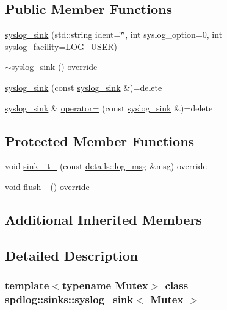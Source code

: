 \subsection*{Public Member Functions}
\begin{DoxyCompactItemize}
\item 
\hyperlink{classspdlog_1_1sinks_1_1syslog__sink_acc60de632a07b329aeba41ee48ced4f6}{syslog\+\_\+sink} (std\+::string ident=\char`\"{}\char`\"{}, int syslog\+\_\+option=0, int syslog\+\_\+facility=L\+O\+G\+\_\+\+U\+S\+ER)
\item 
\hyperlink{classspdlog_1_1sinks_1_1syslog__sink_ae440dafe6eca68065ac0b6438761ac38}{$\sim$syslog\+\_\+sink} () override
\item 
\hyperlink{classspdlog_1_1sinks_1_1syslog__sink_a505adae200592eab1e093ab258ad0291}{syslog\+\_\+sink} (const \hyperlink{classspdlog_1_1sinks_1_1syslog__sink}{syslog\+\_\+sink} \&)=delete
\item 
\hyperlink{classspdlog_1_1sinks_1_1syslog__sink}{syslog\+\_\+sink} \& \hyperlink{classspdlog_1_1sinks_1_1syslog__sink_a3e2454370f91c3fe2befb3f24e25ede7}{operator=} (const \hyperlink{classspdlog_1_1sinks_1_1syslog__sink}{syslog\+\_\+sink} \&)=delete
\end{DoxyCompactItemize}
\subsection*{Protected Member Functions}
\begin{DoxyCompactItemize}
\item 
void \hyperlink{classspdlog_1_1sinks_1_1syslog__sink_a303bccf40cd03356510391c493078005}{sink\+\_\+it\+\_\+} (const \hyperlink{structspdlog_1_1details_1_1log__msg}{details\+::log\+\_\+msg} \&msg) override
\item 
void \hyperlink{classspdlog_1_1sinks_1_1syslog__sink_a6afb5ba7ef5e5f2950e624ec650fb562}{flush\+\_\+} () override
\end{DoxyCompactItemize}
\subsection*{Additional Inherited Members}


\subsection{Detailed Description}
\subsubsection*{template$<$typename Mutex$>$\newline
class spdlog\+::sinks\+::syslog\+\_\+sink$<$ Mutex $>$}

